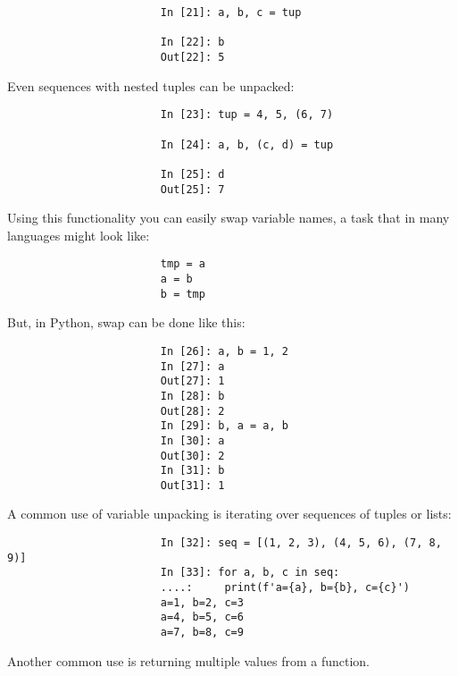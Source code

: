 \documentclass{article}
\begin{document}
\begin{enumerate}
\begin{itemize}
\begin{itemize}
\begin{itemize}
\begin{itemize}
\begin{verbatim}
						In [21]: a, b, c = tup
						
						In [22]: b
						Out[22]: 5
					\end{verbatim}
					Even sequences with nested tuples can be unpacked:
					\begin{verbatim}
						In [23]: tup = 4, 5, (6, 7)
						
						In [24]: a, b, (c, d) = tup
						
						In [25]: d
						Out[25]: 7
					\end{verbatim}
					Using this functionality you can easily swap variable names, a task that in many languages might look like:
					\begin{verbatim}
						tmp = a
						a = b
						b = tmp
					\end{verbatim}
					But, in Python, swap can be done like this:
					\begin{verbatim}
						In [26]: a, b = 1, 2
						In [27]: a
						Out[27]: 1
						In [28]: b
						Out[28]: 2
						In [29]: b, a = a, b
						In [30]: a
						Out[30]: 2
						In [31]: b
						Out[31]: 1
					\end{verbatim}
					A common use of variable unpacking is iterating over sequences of tuples or lists:
					\begin{verbatim}
						In [32]: seq = [(1, 2, 3), (4, 5, 6), (7, 8, 9)]
						In [33]: for a, b, c in seq:
						....:     print(f'a={a}, b={b}, c={c}')
						a=1, b=2, c=3
						a=4, b=5, c=6
						a=7, b=8, c=9
					\end{verbatim}
					Another common use is returning multiple values from a function.
					

\end{itemize}
\end{itemize}
\end{itemize}
\end{itemize}
\end{enumerate}
\end{document}
